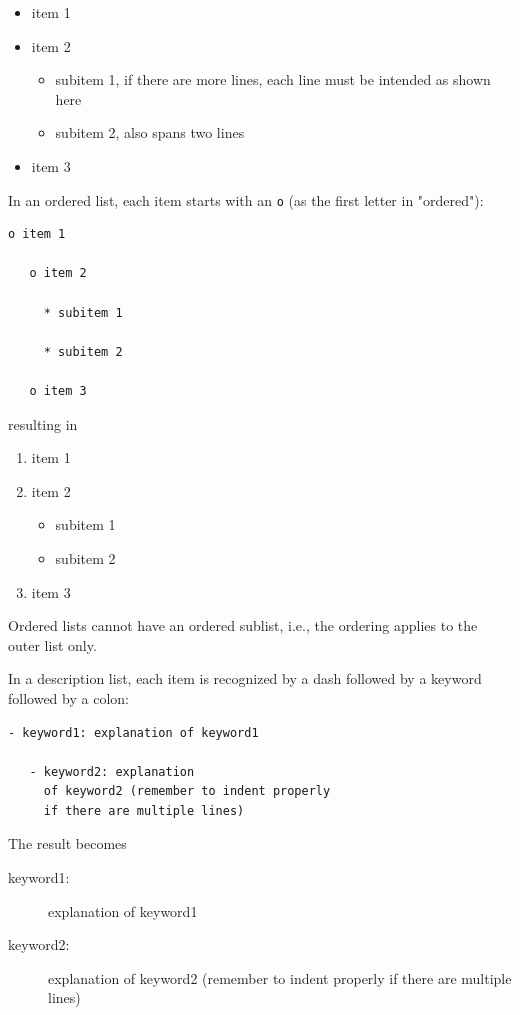 \documentclass{article}
\begin{document}
\begin{itemize}
   \item item 1
   \item item 2
\begin{itemize}
     \item subitem 1, if there are more
       lines, each line must
       be intended as shown here
     \item subitem 2,
       also spans two lines
\end{itemize}
   \item item 3
\end{itemize}
In an ordered list, each item starts with an {\fontsize{10pt}{10pt}\verb!o!} (as the first letter 
in "ordered"):
\begin{Verbatim}[fontsize=\fontsize{9pt}{9pt},tabsize=8,baselinestretch=0.85,
fontfamily=tt,xleftmargin=7mm]
   o item 1

   o item 2

     * subitem 1

     * subitem 2

   o item 3
\end{Verbatim}
\noindent

resulting in

\begin{enumerate}
  \item item 1
  \item item 2
\begin{itemize}
     \item subitem 1
     \item subitem 2
\end{itemize}
  \item item 3
\end{enumerate}
Ordered lists cannot have an ordered sublist, i.e., the ordering 
applies to the outer list only.

In a description list, each item is recognized by a dash followed
by a keyword followed by a colon:
\begin{Verbatim}[fontsize=\fontsize{9pt}{9pt},tabsize=8,baselinestretch=0.85,
fontfamily=tt,xleftmargin=7mm]
   - keyword1: explanation of keyword1

   - keyword2: explanation
     of keyword2 (remember to indent properly
     if there are multiple lines)
\end{Verbatim}
\noindent

The result becomes

\begin{description}
   \item[keyword1:] 
     explanation of keyword1
   \item[keyword2:] 
     explanation
     of keyword2 (remember to indent properly
     if there are multiple lines)
\end{description}
\end{document}
